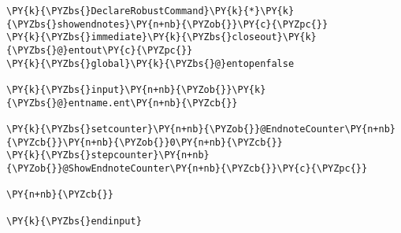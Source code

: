 \begin{Verbatim}[commandchars=\\\{\}]
\PY{k}{\PYZbs{}DeclareRobustCommand}\PY{k}{*}\PY{k}{\PYZbs{}showendnotes}\PY{n+nb}{\PYZob{}}\PY{c}{\PYZpc{}}
\PY{k}{\PYZbs{}immediate}\PY{k}{\PYZbs{}closeout}\PY{k}{\PYZbs{}@}entout\PY{c}{\PYZpc{}}
\PY{k}{\PYZbs{}global}\PY{k}{\PYZbs{}@}entopenfalse

\PY{k}{\PYZbs{}input}\PY{n+nb}{\PYZob{}}\PY{k}{\PYZbs{}@}entname.ent\PY{n+nb}{\PYZcb{}}

\PY{k}{\PYZbs{}setcounter}\PY{n+nb}{\PYZob{}}@EndnoteCounter\PY{n+nb}{\PYZcb{}}\PY{n+nb}{\PYZob{}}0\PY{n+nb}{\PYZcb{}}
\PY{k}{\PYZbs{}stepcounter}\PY{n+nb}{\PYZob{}}@ShowEndnoteCounter\PY{n+nb}{\PYZcb{}}\PY{c}{\PYZpc{}}

\PY{n+nb}{\PYZcb{}}

\PY{k}{\PYZbs{}endinput}
\end{Verbatim}

\DeclareRobustCommand*\showendnotes{%
\immediate\closeout\@entout%
\global\@entopenfalse



\setcounter{@EndnoteCounter}{0}
\stepcounter{@ShowEndnoteCounter}%

}

\endinput

